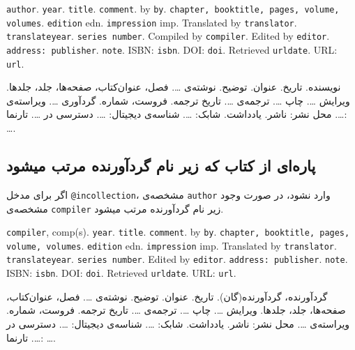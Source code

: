 \documentclass[a4paper,11pt]{article}
\begin{document}
\begin{itemize}[nosep]
\begin{latin}
\item[] []
{\tt author}. {\tt year}. {\tt title}. {\tt comment}. by {\tt by}. {\tt chapter, booktitle, pages, volume, volumes}. {\tt edition} edn. {\tt impression} imp. Translated by {\tt translator}. {\tt translateyear}. {\tt series number}. Compiled by {\tt compiler}. Edited by {\tt editor}. {\tt address: publisher}. {\tt note}. ISBN: {\tt isbn}. DOI: {\tt doi}. Retrieved {\tt urldate}. URL: {\tt url}. 
\end{latin}

\item[] []
{\persianttfamily نویسنده}. {\persianttfamily تاریخ}. {\persianttfamily عنوان}. {\persianttfamily توضیح}. نوشته‌ی {\persianttfamily …}. {\persianttfamily فصل، عنوان‌کتاب، صفحه‌ها، جلد، جلدها}. ویرایش {\persianttfamily …}. چاپ {\persianttfamily …}. ترجمه‌ی {\persianttfamily …}. {\persianttfamily تاریخ ترجمه}. {\persianttfamily فروست، شماره}. گردآوری {\persianttfamily …}. ویراسته‌ی {\persianttfamily …}. {\persianttfamily محل نشر: ناشر}. {\persianttfamily یادداشت}. شابک: {\persianttfamily …}. شناسه‌ی دیجیتال: {\persianttfamily …}. دسترسی در {\persianttfamily …}. تارنما: {\persianttfamily …}. 
\end{itemize}





\subsection{پاره‌ای از کتاب که زیر نام گردآورنده مرتب میشود}
اگر برای مدخل \verb|@incollection|، مشخصه‌ی \verb|author| وارد نشود، در صورت وجود مشخصه‌ی \verb|compiler| زیر نام گردآورنده مرتب میشود.

\begin{itemize}[nosep]
\begin{latin}
\item[] []
{\tt compiler}, comp(s). {\tt year}. {\tt title}. {\tt comment}. by {\tt by}. {\tt chapter, booktitle, pages, volume, volumes}. {\tt edition} edn. {\tt impression} imp. Translated by {\tt translator}. {\tt translateyear}. {\tt series number}. Edited by {\tt editor}. {\tt address: publisher}. {\tt note}. ISBN: {\tt isbn}. DOI: {\tt doi}. Retrieved {\tt urldate}. URL: {\tt url}. 
\end{latin}

\item[] []
{\persianttfamily گردآورنده}، گردآورنده(گان). {\persianttfamily تاریخ}. {\persianttfamily عنوان}. {\persianttfamily توضیح}. نوشته‌ی {\persianttfamily …}. {\persianttfamily فصل، عنوان‌کتاب، صفحه‌ها، جلد، جلدها}. ویرایش {\persianttfamily …}. چاپ {\persianttfamily …}. ترجمه‌ی {\persianttfamily …}. {\persianttfamily تاریخ ترجمه}. {\persianttfamily فروست، شماره}. ویراسته‌ی {\persianttfamily …}. {\persianttfamily محل نشر: ناشر}. {\persianttfamily یادداشت}. شابک: {\persianttfamily …}. شناسه‌ی دیجیتال: {\persianttfamily …}. دسترسی در {\persianttfamily …}. تارنما: {\persianttfamily …}. 
\end{itemize}
\end{document}
